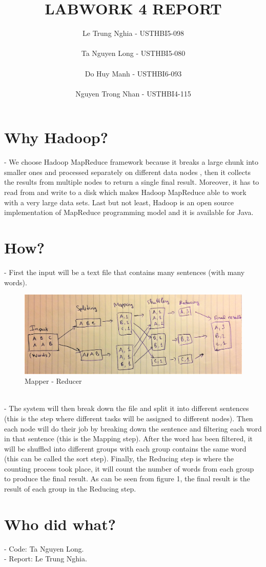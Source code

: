 \documentclass[12pt,a4paper]{article}
\title{LABWORK 4 REPORT}
\author{Le Trung Nghia - USTHBI5-098 \\ \\ Ta Nguyen Long - USTHBI5-080 \\ \\ Do Huy Manh - USTHBI6-093 \\ \\ Nguyen Trong Nhan - USTHBI4-115}
\begin{document}
\maketitle
\newpage 
\section{Why Hadoop?}
- We choose Hadoop MapReduce framework because it breaks a large chunk into smaller ones and processed separately on different data nodes , then it collects the results from multiple nodes to return a single final result. Moreover, it has to read from and write to a disk which makes Hadoop MapReduce able to work with a very large data sets. Last but not least, Hadoop is an open source implementation of MapReduce programming model and it is available for Java.
\section{How?}
- First the input will be a text file that contains many sentences (with many words).
\begin{figure}[!htb]
\includegraphics[width=\linewidth]{Mapper-Reducer.jpg}
\caption{Mapper - Reducer}
\end{figure}
\\ - The system will then break down the file and split it into different sentences (this is the step where different tasks will be assigned to different nodes). Then each node will do their job by breaking down the sentence and filtering each word in that sentence (this is the Mapping step). After the word has been filtered, it will be shuffled into different groups with each group contains the same word (this can be called the sort step). Finally, the Reducing step is where the counting process took place, it will count the number of words from each group to produce the final result. As can be seen from figure 1, the final result is the result of each group in the Reducing step.
\section{Who did what?}
- Code: Ta Nguyen Long. \\
- Report: Le Trung Nghia.
\end{document}
